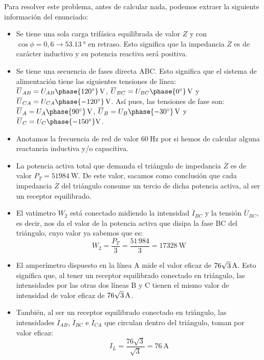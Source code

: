 Para resolver este problema, antes de calcular
nada, podemos extraer la siguiente información del enunciado:
\begin{itemize} %
\item Se tiene una sola carga trifásica equilibrada de valor $Z$ y con
  $\cos{\phi}=0,6\rightarrow \qty{53.13}{\degree}$ en retraso. Esto
  significa que la impedancia $\overline{Z}$ es de carácter inductivo
  y su potencia reactiva será positiva.
\item Se tiene una secuencia de fases directa ABC. Esto significa que
  el sistema de alimentación tiene las siguientes tensiones de línea:
  $\overline{U}_{AB}={U_{AB}\phase{\ang{120}}}\,\unit{\volt}$,
  $\overline{U}_{BC}={U_{BC}\phase{\ang{0}}}\,\unit{\volt}$
  y
  $\overline{U}_{CA}={U_{CA}\phase{\ang{-120}}}\,\unit{\volt}$. Así
  pues, las tensiones de fase son:
  $\overline{U}_{A}={U_{A}\phase{\ang{90}}}\,\unit{\volt}$,
  $\overline{U}_{B}={U_{B}\phase{\ang{-30}}}\,\unit{\volt}$
  y
  $\overline{U}_{C}={U_{C}\phase{\ang{-150}}}\unit{\volt}$.
\item Anotamos la frecuencia de red de valor $\qty{60}{\hertz}$ por si
  hemos de calcular alguna reactancia inductiva y/o capacitiva.
\item La potencia activa total que demanda el triángulo de impedancia
  $\overline{Z}$ es de valor $P_T=\qty{51984}{\watt}$. De este valor,
  sacamos como conclusión que cada impedancia $\overline{Z}$ del
  triángulo consume un tercio de dicha potencia activa, al ser un
  receptor equilibrado.
\item El vatímetro $W_2$ está conectado midiendo la intensidad
  $\overline{I}_{BC}$ y la tensión $\overline{U}_{BC}$, es decir, nos
  da el valor de la potencia activa que disipa la fase BC del
  triángulo, cuyo valor ya sabemos que es:
  \[
    W_2=\dfrac{P_T}{3}=\dfrac{51\,984}{3}=\qty{17328}{\watt}
  \]
\item El amperímetro dispuesto en la línea A mide el valor eficaz de
  $\qty[parse-numbers=false]{76\sqrt{3}}{\ampere}$. Esto significa que,
  al tener un receptor equilibrado conectado en triángulo, las
  intensidades por las otras dos líneas B y C tienen el mismo valor de
  intensidad de valor eficaz de
  $\qty[parse-numbers=false]{76\sqrt{3}}{\ampere}$.
\item También, al ser un receptor equilibrado conectado en triángulo,
  las intensidades $\overline{I}_{AB}$, $\overline{I}_{BC}$ e
  $\overline{I}_{CA}$ que circulan dentro del triángulo, toman por
  valor eficaz:
  \[
    I_L = \dfrac{76\sqrt{3}}{\sqrt{3}}=\qty{76}{\ampere}
\]
\end{itemize}
